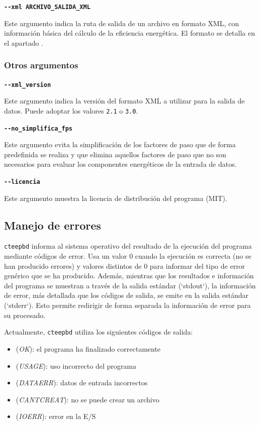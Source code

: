 \documentclass[10pt,notitlepage,oneside,a4paper]{article}
\begin{document}
\textbf{\texttt{-{}-xml ARCHIVO\_SALIDA\_XML}}

Este argumento indica la ruta de salida de un archivo en formato XML, con información básica del cálculo de la eficiencia energética. El formato se detalla en el apartado .

\subsubsection{Otros argumentos}

\textbf{\texttt{-{}-xml\_version}}

Este argumento indica la versión del formato XML a utilizar para la salida de datos. Puede adoptar los valores \texttt{2.1} o \texttt{3.0}.

\textbf{\texttt{-{}-no\_simplifica\_fps}}

Este argumento evita la simplificación de los factores de paso que de forma predefinida se realiza y que elimina aquellos factores de paso que no son necesarios para evaluar los componentes energéticos de la entrada de datos.

\textbf{\texttt{-{}-licencia}}

Este argumento muestra la licencia de distribución del programa (MIT).


\subsection{Manejo de errores}

\texttt{cteepbd} informa al sistema operativo del resultado de la ejecución del programa mediante códigos de error. Usa un valor 0 cuando la ejecución es correcta (no se han producido errores) y valores distintos de 0 para informar del tipo de error genérico que se ha producido. Además, mientras que los resultados e información del programa se muestran a través de la salida estándar (`stdout`), la información de error, más detallada que los códigos de salida, se emite en la salida estándar (`stderr`). Esto permite redirigir de forma separada la información de error para su procesado.

Actualmente, \texttt{cteepbd} utiliza los siguientes códigos de salida:

\begin{itemize}
\item[0] (\textit{OK}): el programa ha finalizado correctamente
\item[64] (\textit{USAGE}): uso incorrecto del programa
\item[65] (\textit{DATAERR}): datos de entrada incorrectos
\item[73] (\textit{CANTCREAT}): no se puede crear un archivo
\item[74] (\textit{IOERR}): error en la E/S
\end{itemize}
\end{document}
